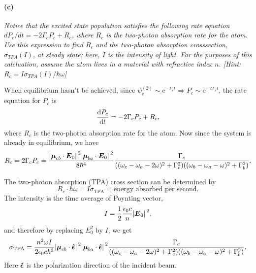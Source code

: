 \documentclass[hyperref, a4paper]{article}
\newcommand*{\ee}{\mathrm{e}}
\begin{document}
\paragraph*{(c)} \textit{
    Notice that the excited state population satisfies the following rate equation $d P_c / d t=-2 \Gamma_c P_c+R_c$, where $R_c$ is the two-photon absorption rate for the atom. Use this expression to find $R_c$ and the two-photon absorption crosssection, $\sigma_{T P A}(I)$, at steady state; here, $I$ is the intensity of light. For the purposes of this calcluation, assume the atom lives in a material with refractive index $n$. [Hint: $R_c=I \sigma_{T P A}(I) / \hbar \omega$]
}

When equilibrium hasn't be achieved, since $\psi_c^{(2)} \sim \ee^{- \Gamma_c t} \Rightarrow 
P_c \sim \ee^{- 2 \Gamma_c t}$, the rate equation for $P_c$ is 
\begin{equation}
    \dv{P_c}{t} = - 2 \Gamma_c P_c + R_c,
\end{equation}
where $R_c$ is the two-photon absorption rate for the atom. 
Now since the system is already in equilibrium, 
we have 
\begin{equation}
    R_c = 2 \Gamma_c P_c 
    = \frac{
        \abs*{\vb*{\mu}_{cb} \cdot \vb*{E}_0}^2 
        \abs*{\vb*{\mu}_{ba} \cdot \vb*{E}_0}^2
    }{8 \hbar^4} 
    \frac{\Gamma_c}{
        ((\omega_c - \omega_a - 2 \omega)^2 + \Gamma_c^2 )
        ((\omega_b - \omega_a - \omega)^2 + \Gamma_b^2)
    }.
\end{equation} 

The two-photon absorption (TPA) cross section can be determined by 
\begin{equation}
    R_c \cdot \hbar \omega = I \sigma_{\text{TPA}} = \text{energy absorbed per second}.
\end{equation}
The intensity is the time average of Poynting vector, 
\begin{equation}
    I = \frac{1}{2} \frac{\epsilon_0 c }{n}  \abs*{\vb*{E}_0}^2,
\end{equation}
and therefore by replacing $E_0^2$ by $I$, we get 
\begin{equation}
    \sigma_{\text{TPA}} = \frac{n^2 \omega I}{2 \epsilon_0 c \hbar^3} 
    \abs*{\vb*{\mu}_{cb} \cdot \vu*{\epsilon}}^2 
    \abs*{\vb*{\mu}_{ba} \cdot \vu*{\epsilon}}^2
    \frac{\Gamma_c}{
        ((\omega_c - \omega_a - 2 \omega)^2 + \Gamma_c^2 )
        ((\omega_b - \omega_a - \omega)^2 + \Gamma_b^2)
    }.
\end{equation}
Here $\vu*{\epsilon}$ is the polarization direction of the incident beam.
\end{document}
